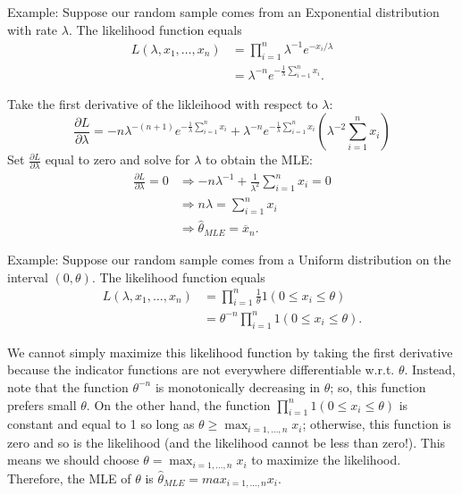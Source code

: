 \documentclass[
]{book}
\begin{document}
Example: Suppose our random sample comes from an Exponential distribution with rate \(\lambda\). The likelihood function equals
\begin{align*}
L(\lambda, x_1, \ldots, x_n) &= \prod_{i=1}^n \lambda^{-1}e^{-x_i/\lambda}\\
& = \lambda ^{-n}e^{-\tfrac1\lambda\sum_{i=1}^n x_i}.
\end{align*}

Take the first derivative of the likleihood with respect to \(\lambda\):
\[\frac{\partial L}{\partial \lambda} = -n\lambda^{-(n+1)}e^{-\tfrac1\lambda \sum_{i=1}^n x_i} + \lambda^{-n}e^{-\tfrac1\lambda\sum_{i=1}^n x_i}\left(\lambda^{-2}\sum_{i=1}^n x_i\right)\]
Set \(\tfrac{\partial L}{\partial \lambda}\) equal to zero and solve for \(\lambda\) to obtain the MLE:
\begin{align*}
\frac{\partial L}{\partial \lambda} = 0 & \Rightarrow -n\lambda^{-1} + \tfrac{1}{\lambda^2}\sum_{i=1}^n x_i = 0\\
& \Rightarrow n\lambda = \sum_{i=1}^n x_i\\
& \Rightarrow \hat{\theta}_{MLE} = \overline x_n.
\end{align*}

Example: Suppose our random sample comes from a Uniform distribution on the interval \((0,\theta)\). The likelihood function equals
\begin{align*}
L(\lambda, x_1, \ldots, x_n) &= \prod_{i=1}^n \frac{1}{\theta}1(0\leq x_i\leq \theta) \\
& = \theta^{-n}\prod_{i=1}^n 1(0\leq x_i\leq \theta).
\end{align*}

We cannot simply maximize this likelihood function by taking the first derivative because the indicator functions are not everywhere differentiable w.r.t. \(\theta\). Instead, note that the function \(\theta^{-n}\) is monotonically decreasing in \(\theta\); so, this function prefers small \(\theta\). On the other hand, the function \(\prod_{i=1}^n 1(0\leq x_i\leq \theta)\) is constant and equal to 1 so long as \(\theta \geq \max_{i=1, \ldots, n} x_i\); otherwise, this function is zero and so is the likelihood (and the likelihood cannot be less than zero!). This means we should choose \(\theta = \max_{i=1, \ldots, n} x_i\) to maximize the likelihood. Therefore, the MLE of \(\theta\) is \(\hat\theta_{MLE} = max_{i=1, \ldots, n} x_i\).
\end{document}
